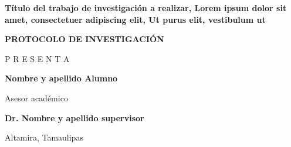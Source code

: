 \begin{titlepage}
\begin{minipage}{0.2 \textwidth}
    \end{minipage}
    
    \vspace{2cm}
    
    {\LARGE \bfseries Título del trabajo de investigación a realizar, Lorem ipsum dolor sit amet, consectetuer adipiscing elit, Ut purus elit, vestibulum ut\par}
    
    \vspace{1.5cm}
    
    {\Large \bfseries PROTOCOLO DE INVESTIGACIÓN\par}
    
    \vfill
    
    {\large P R E S E N T A} \par
    \vspace{0.5cm}
    {\Large \bfseries Nombre y apellido Alumno\par}
    
    \vspace{2cm}
    
    {\large Asesor académico}\par
    \vspace{0.5cm}
    {\Large \bfseries Dr. Nombre y apellido supervisor\par}
    
    \vfill
    
    \begin{multicols}{2}
        {\large Altamira, Tamaulipas\par}
        \columnbreak
    \end{multicols}
    
\end{titlepage}